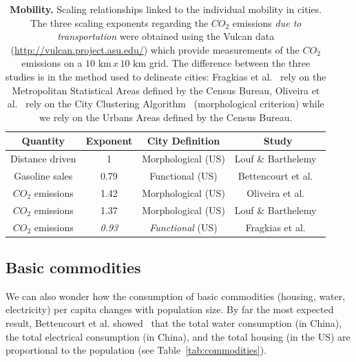 \begin{table}[!h]
    \centering
\begin{tabular}{|cccc|}
\hline
Quantity & Exponent & City Definition & Study\\
\hline
Distance driven & 1 & Morphological (US) & Louf \& Barthelemy~\cite{Louf:2014_scaling} \\
Gasoline sales & 0.79 & Functional (US) & Bettencourt et al.~\cite{Bettencourt:2007}\\
\hline
$CO_2$ emissions & 1.42 & Morphological (US) & Oliveira et al.~\cite{Oliveira:2014}\\
$CO_2$ emissions & 1.37 & Morphological (US) & Louf \&
Barthelemy~\cite{Louf:2014_smog}\\
$CO_2$ emissions & \emph{0.93} & \emph{Functional} (US) & Fragkias et al.~\cite{Fragkias:2013}\\
\hline
\end{tabular}
\caption{{\bf Mobility. } Scaling relationships linked to the individual
    mobility in cities. The three scaling exponents regarding the $CO_2$
    emissions \emph{due to transportation} were obtained using the
    Vulcan data (\url{http://vulcan.project.asu.edu/}) which provide
    measurements of the $CO_2$ emissions on a $10\text{ km}\,x\,10\text{ km}$
    grid. The difference between the three studies is in the method used to
    delineate cities: Fragkias et al.~\cite{Fragkias:2013} rely on the Metropolitan Statistical Areas
    defined by the Census Bureau, Oliveira et al.~\cite{Oliveira:2014} rely on
    the City Clustering Algorithm~\cite{Rozenfeld:2008} (morphological
    criterion) while we rely on the Urbans Areas defined by the Census
    Bureau.\label{tab:mobility}
}
\end{table}



\subsection{Basic commodities}
\label{sub:basic_commodities}

We can also wonder how the consumption of basic commodities (housing, water,
electricity) per capita changes with population size. By far the most expected
result, Bettencourt et al. showed~\cite{Bettencourt:2007} that the total water
consumption (in China), the total electrical consumption (in China),  and the
total housing (in the US) are proportional to the population (see
Table~\ref{tab:commodities}).\\

